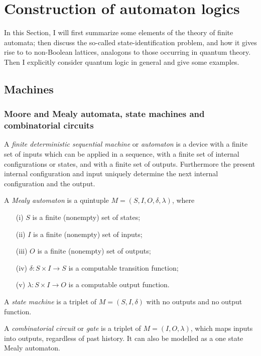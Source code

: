 \section{Construction of automaton logics}
In this Section, I will first summarize some elements of the theory of
finite automata; then discuss the so-called state-identification
problem, and how it gives rise to to non-Boolean lattices, analogons to
those occurring in quantum theory.
Then I explicitly consider quantum logic in general and
give some examples.


\subsection{Machines}

\subsubsection{Moore and Mealy automata, state machines and combinatorial
circuits}

A {\em finite deterministic sequential machine} or {\em automaton}
\cite{e-f-moore,hopcroft,hartmanis}
is a device
with
a finite set of inputs which can be applied in a sequence, with
a finite set of internal configurations or states, and with
a finite set of outputs.
Furthermore
the present internal configuration and input uniquely determine the next
internal configuration and the output.

A {\em Mealy automaton} is a quintuple $M=(S,I,O,\delta
,\lambda
)$, where
\begin{enumerate}
\item[(i)]
$S$ is a finite (nonempty) set of states;
\item[(ii)]
$I$ is a finite (nonempty) set of inputs;
\item[(iii)]
$O$ is a finite (nonempty) set of outputs;
\item[(iv)]
$\delta : S\times I\longrightarrow S$ is a computable transition
function;
\item[(v)]
$\lambda : S\times I\longrightarrow O$ is a computable output
function.
\end{enumerate}

A {\em state machine} is a triplet of  $M=(S,I,\delta )$ with no outputs
and no output function.

A {\em combinatorial circuit} or {\em gate} is a triplet
of $M=(I,O,\lambda
)$, which
maps inputs into outputs, regardless of past history. It can also be
modelled as a one state Mealy automaton.



